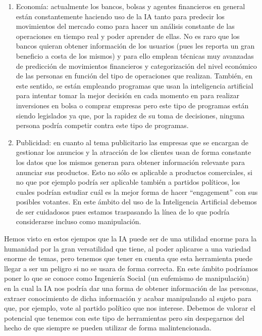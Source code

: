 \begin{enumerate}
  \item Economía: actualmente los bancos, bolsas y agentes financieros en general están constantemente haciendo uso de la IA tanto para predecir los movimientos del mercado como para hacer un análisis constante de las operaciones en tiempo real y poder aprender de ellas. No es raro que los bancos quieran obtener información de los usuarios (pues les reporta un gran beneficio a costa de los mismos) y para ello emplean técnicas muy avanzadas de predicción de movimientos financieros y categorización del nivel económico de las personas en función del tipo de operaciones que realizan. También, en este sentido, se están empleando programas que usan la inteligencia artificial para intentar tomar la mejor decisión en cada momento en para realizar inversiones en bolsa o comprar empresas pero este tipo de programas están siendo legislados ya que, por la rapidez de su toma de decisiones, ninguna persona podría competir contra este tipo de programas.
  \item Publicidad: en cuanto al tema publicitario las empresas que se encargan de gestionar los anuncios y la atracción de los clientes usan de forma constante los datos que los mismos generan para obtener información relevante para anunciar sus productos. Esto no sólo es aplicable a productos comerciales, si no que por ejemplo podría ser aplicable también a partidos políticos, los cuales podrían estudiar cuál es la mejor forma de hacer ``engagement'' con sus posibles votantes. En este ámbito del uso de la Inteligencia Artificial debemos de ser cuidadosos pues estamos traspasando la línea de lo que podría considerarse incluso como manipulación.
\end{enumerate}

Hemos visto en estos ejempos que la IA puede ser de una utilidad enorme para la humanidad por la gran versatilidad que tiene, al poder aplicarse a una variedad enorme de temas, pero tenemos que tener en cuenta que esta herramienta puede llegar a ser un peligro si no se usara de forma correcta. En este ámbito podríamos poner lo que se conoce como Ingeniería Social (un eufemismo de manipulación) en la cual la IA nos podría dar una forma de obtener información de las personas, extraer conocimiento de dicha información y acabar manipulando al sujeto para que, por ejemplo, vote al partido político que nos interese. Debemos de valorar el potencial que tenemos con este tipo de herramientas pero sin despegarnos del hecho de que siempre se pueden utilizar de forma malintencionada.


